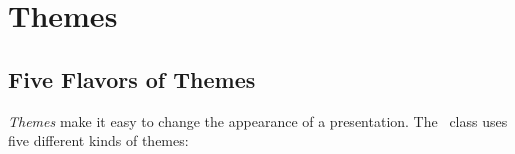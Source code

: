 %
%
%

\section{Themes}

\subsection{Five Flavors of Themes}

\emph{Themes} make it easy to change the appearance of a
presentation. The \beamer\ class uses five different kinds of themes:
